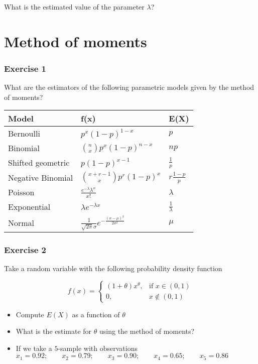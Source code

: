 \documentclass[
]{book}
\providecommand{\tightlist}{%
  \setlength{\itemsep}{0pt}\setlength{\parskip}{0pt}}
\begin{document}
What is the estimated value of the parameter \(\lambda\)?

\hypertarget{method-of-moments-11}{%
\section{Method of moments}\label{method-of-moments-11}}

\hypertarget{exercise-1-8}{%
\subsubsection{Exercise 1}\label{exercise-1-8}}

What are the estimators of the following parametric models given by the method of moments?

\begin{longtable}[]{@{}lll@{}}
\toprule
Model & f(x) & E(X) \\
\midrule
\endhead
Bernoulli & \(p^x(1-p)^{1-x}\) & \(p\) \\
Binomial & \(\binom n x p^x(1-p)^{n-x}\) & \(np\) \\
Shifted geometric & \(p(1-p)^{x-1}\) & \(\frac{1}{p}\) \\
Negative Binomial & \(\binom {x+r-1} x p^r(1-p)^x\) & \(r\frac{1-p}{p}\) \\
Poisson & \(\frac{e^{-\lambda}\lambda^x}{x!}\) & \(\lambda\) \\
Exponential & \(\lambda e^{-\lambda x}\) & \(\frac{1}{\lambda}\) \\
Normal & \(\frac{1}{\sqrt{2\pi}\sigma}e^{-\frac{(x-\mu)^2}{2\sigma^2}}\) & \(\mu\) \\
\bottomrule
\end{longtable}

\hypertarget{exercise-2-8}{%
\subsubsection{Exercise 2}\label{exercise-2-8}}

Take a random variable with the following probability density function

\[
f(x)=
\begin{cases}
    (1+\theta)x^\theta,& \text{if } x\in (0,1)\\
    0,& x\notin (0,1)
\end{cases}
\]

\begin{itemize}
\tightlist
\item
  Compute \(E(X)\) as a function of \(\theta\)
\item
  What is the estimate for \(\theta\) using the method of moments?
\item
  If we take a \(5\)-sample with observations
  \(x_1 = 0.92; \qquad x_2 = 0.79; \qquad x_3 = 0.90; \qquad x_4 = 0.65; \qquad x_5 = 0.86\)
\end{itemize}
\end{document}
